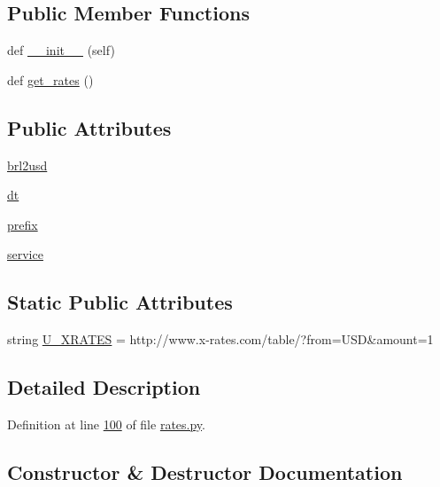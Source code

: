 \subsection*{Public Member Functions}
\begin{DoxyCompactItemize}
\item 
def \hyperlink{classrates_1_1_x_rates_a86fb4ba66a218c5f25b5b2c1f2a8345b}{\+\_\+\+\_\+init\+\_\+\+\_\+} (self)
\item 
def \hyperlink{classrates_1_1_x_rates_a034e274f1bf0a2509af2621eb27c7cce}{get\+\_\+rates} ()
\end{DoxyCompactItemize}
\subsection*{Public Attributes}
\begin{DoxyCompactItemize}
\item 
\hyperlink{classrates_1_1_x_rates_acb0a8b6ec059b823c8a46eb115341251}{brl2usd}
\item 
\hyperlink{classrates_1_1_x_rates_aa7835a0ac1d41af607d6d5885b49c131}{dt}
\item 
\hyperlink{classrates_1_1_x_rates_a3b92b41b0fbd77b44d01f094ff83dd9d}{prefix}
\item 
\hyperlink{classrates_1_1_x_rates_ad80e3c0295deaa15fac085324716747f}{service}
\end{DoxyCompactItemize}
\subsection*{Static Public Attributes}
\begin{DoxyCompactItemize}
\item 
string \hyperlink{classrates_1_1_x_rates_ab3bd64c08e6503f0d76c9f73dc38fa25}{U\+\_\+\+X\+R\+A\+T\+ES} = \textquotesingle{}http\+://www.\+x-\/rates.\+com/table/?from=U\+SD\&amount=1\textquotesingle{}
\end{DoxyCompactItemize}


\subsection{Detailed Description}


Definition at line \hyperlink{rates_8py_source_l00100}{100} of file \hyperlink{rates_8py_source}{rates.\+py}.



\subsection{Constructor \& Destructor Documentation}
